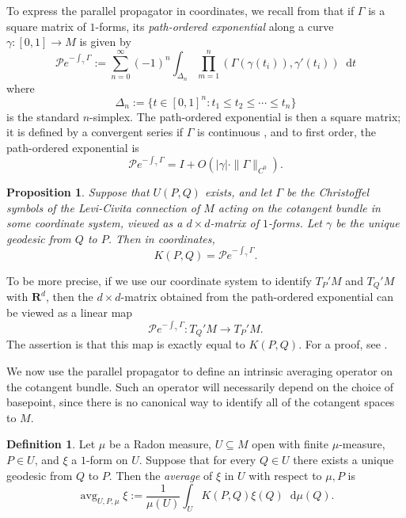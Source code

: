 \documentclass[reqno,11pt]{amsart}
\newcommand{\RR}{\mathbf{R}}
\DeclareMathOperator{\avg}{avg}
\newcommand*\dif{\mathop{}\!\mathrm{d}}
\newcommand{\dfn}[1]{\emph{#1}\index{#1}}
\newtheorem{proposition}[theorem]{Proposition}
\theoremstyle{definition}
\newtheorem{definition}[theorem]{Definition}
\numberwithin{equation}{section}
\begin{document}
To express the parallel propagator in coordinates, we recall from \cite[Chapter II, \S2]{baez1994gauge} that if $\Gamma$ is a square matrix of $1$-forms, its \dfn{path-ordered exponential} along a curve $\gamma: [0, 1] \to M$ is given by 
$$\mathcal Pe^{-\int_\gamma \Gamma} := \sum_{n=0}^\infty (-1)^n \int_{\Delta_n} \prod_{m=1}^n (\Gamma(\gamma(t_i)), \gamma'(t_i)) \dif t$$
where 
$$\Delta_n := \{t \in [0, 1]^n: t_1 \leq t_2 \leq \cdots \leq t_n\}$$
is the standard $n$-simplex.
The path-ordered exponential is then a square matrix; it is defined by a convergent series if $\Gamma$ is continuous \cite[Chapter II, \S2]{baez1994gauge}, and to first order, the path-ordered exponential is
\begin{equation}\label{path ordered exponential taylor series}
\mathcal Pe^{-\int_\gamma \Gamma} = I + O(|\gamma| \cdot \|\Gamma\|_{C^0}).
\end{equation}

\begin{proposition}
Suppose that $U(P, Q)$ exists, and let $\Gamma$ be the Christoffel symbols of the Levi-Civita connection of $M$ acting on the cotangent bundle in some coordinate system, viewed as a $d \times d$-matrix of $1$-forms.
Let $\gamma$ be the unique geodesic from $Q$ to $P$. Then in coordinates,
\begin{equation}\label{path ordered exponential is propagator}
K(P, Q) = \mathcal Pe^{-\int_\gamma \Gamma}.
\end{equation}
\end{proposition}

To be more precise, if we use our coordinate system to identify $T_P'M$ and $T_Q'M$ with $\RR^d$, then the $d\times d$-matrix obtained from the path-ordered exponential can be viewed as a linear map
$$\mathcal Pe^{-\int_\gamma \Gamma}: T_Q'M \to T_P'M.$$
The assertion is that this map is exactly equal to $K(P, Q)$.
For a proof, see \cite[Chapter II, \S2]{baez1994gauge}.

We now use the parallel propagator to define an intrinsic averaging operator on the cotangent bundle.
Such an operator will necessarily depend on the choice of basepoint, since there is no canonical way to identify all of the cotangent spaces to $M$.

\begin{definition}
Let $\mu$ be a Radon measure, $U \subseteq M$ open with finite $\mu$-measure, $P \in U$, and $\xi$ a $1$-form on $U$.
Suppose that for every $Q \in U$ there exists a unique geodesic from $Q$ to $P$.
Then the \dfn{average} of $\xi$ in $U$ with respect to $\mu, P$ is 
$$\avg_{U, P, \mu} \xi := \frac{1}{\mu(U)} \int_U K(P, Q)\xi(Q) \dif \mu(Q).$$
\end{definition}
\end{document}
